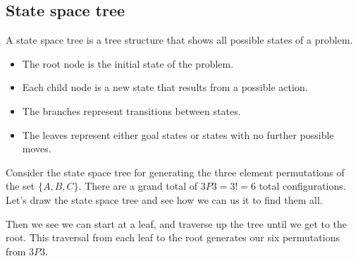 \documentclass{report}
\begin{document}
\subsection{State space tree}
\bigbreak \noindent 
A state space tree is a tree structure that shows all possible states of a problem.
\begin{itemize}
    \item The root node is the initial state of the problem.
    \item Each child node is a new state that results from a possible action.
    \item The branches represent transitions between states.
    \item The leaves represent either goal states or states with no further possible moves.
\end{itemize}
\bigbreak \noindent 
Consider the state space tree for generating the three element permutations of the set $\{A,B,C\}$. There are a grand total of $3P3 = 3! = 6$ total configurations. Let's draw the state space tree and see how we can us it to find them all.
\bigbreak \noindent 
\begin{figure}[ht]
    \centering
    \label{fig:statespace2}
\end{figure}
\bigbreak \noindent 
Then we see we can start at a leaf, and traverse up the tree until we get to the root. This traversal from each leaf to the root generates our six permutations from $3P3$.
\end{document}
